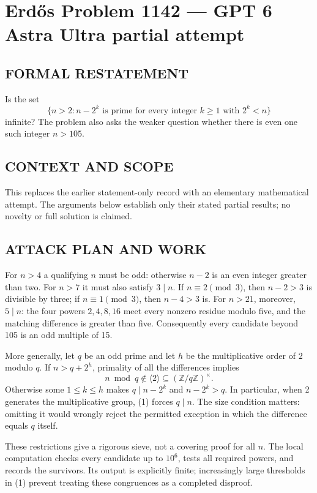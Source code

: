 \section*{Erd\H{o}s Problem 1142 --- GPT 6 Astra Ultra partial attempt}


\subsection*{FORMAL RESTATEMENT}
Is the set
\[
\{n>2: n-2^k\text{ is prime for every integer }k\geq1\text{ with }2^k<n\}
\]
infinite? The problem also asks the weaker question whether there is even one such integer $n>105$.

\subsection*{CONTEXT AND SCOPE}
This replaces the earlier statement-only record with an elementary mathematical attempt. The arguments below establish only their stated partial results; no novelty or full solution is claimed.

\subsection*{ATTACK PLAN AND WORK}
For $n>4$ a qualifying $n$ must be odd: otherwise $n-2$ is an even integer
greater than two. For $n>7$ it must also satisfy $3\mid n$. If $n\equiv2\pmod3$,
then $n-2>3$ is divisible by three; if $n\equiv1\pmod3$, then $n-4>3$ is.
For $n>21$, moreover, $5\mid n$: the four powers $2,4,8,16$ meet every
nonzero residue modulo five, and the matching difference is greater than five.
Consequently every candidate beyond 105 is an odd multiple of 15.

More generally, let $q$ be an odd prime and let $h$ be the multiplicative order
of 2 modulo $q$. If $n>q+2^h$, primality of all the differences implies
\[n\bmod q\notin\langle2\rangle\subseteq(\mathbb Z/q\mathbb Z)^\times.\tag{1}\]
Otherwise some $1\le k\le h$ makes $q\mid n-2^k$ and $n-2^k>q$.
In particular, when 2 generates the multiplicative group, (1) forces $q\mid n$.
The size condition matters: omitting it would wrongly reject the permitted
exception in which the difference equals $q$ itself.

These restrictions give a rigorous sieve, not a covering proof for all $n$.
The local computation checks every candidate up to $10^6$, tests all required
powers, and records the survivors. Its output is explicitly finite; increasingly
large thresholds in (1) prevent treating these congruences as a completed disproof.

